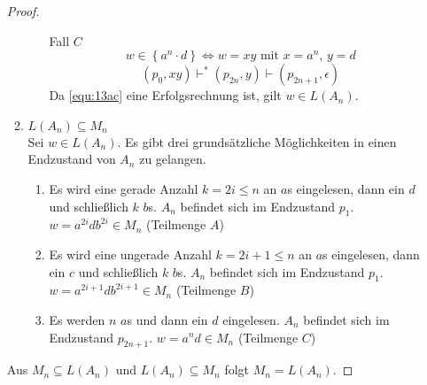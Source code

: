 \documentclass[a4paper]{scrartcl}
\begin{document}
\begin{enumerate}
\begin{proof}
\begin{enumerate}
\begin{enumerate}
                        \item[Fall $C$] 
                            \begin{equation}
                                w \in \left\{ a^n \cdot d \right\} \Leftrightarrow w = xy \text{ mit } x = a^n \text{, } y = d
                            \end{equation}
                            \begin{equation}
                                \label{equ:13ac}
                                (p_0, xy) \vdash^* (p_{2n}, y) \vdash (p_{2n+1}, \epsilon)
                            \end{equation}
                            Da \eqref{equ:13ac} eine Erfolgsrechnung ist, gilt $w \in L(A_n)$.
                            
                    \end{enumerate}
                \item $L(A_n) \subseteq M_n$ \\
                    Sei $w \in L(A_n)$.
                    Es gibt drei grundsätzliche Möglichkeiten in einen
                    Endzustand von $A_n$ zu gelangen.
                    \begin{enumerate}
                        \item
                            Es wird eine gerade Anzahl $k = 2i \leq n$ an $a$s
                            eingelesen, dann ein $d$ und schließlich $k$ $b$s.
                            $A_n$ befindet sich im Endzustand $p_1$.
                            $w = a^{2i}db^{2i} \in M_n$ (Teilmenge $A$)
                        \item
                            Es wird eine ungerade Anzahl $k = 2i+1 \leq n$ an
                            $a$s eingelesen, dann ein $c$ und schließlich $k$
                            $b$s.
                            $A_n$ befindet sich im Endzustand $p_1$.
                            $w = a^{2i+1}db^{2i+1} \in M_n$ (Teilmenge $B$)
                        \item
                            Es werden $n$ $a$s und dann ein $d$ eingelesen.
                            $A_n$ befindet sich im Endzustand $p_{2n+1}$.
                            $w = a^nd \in M_n$ (Teilmenge $C$)
                    \end{enumerate}
            \end{enumerate}
            Aus $M_n \subseteq L(A_n)$ und $L(A_n) \subseteq M_n$ folgt
            $M_n = L(A_n)$.
        \end{proof}


\end{enumerate}
\end{document}
